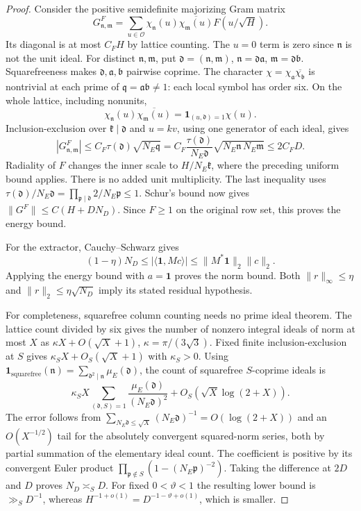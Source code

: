 \documentclass[11pt]{article}
\theoremstyle{remark}\newtheorem{remark}[theorem]{Remark}
\begin{document}
\begin{proof}
Consider the positive semidefinite majorizing Gram matrix
\[
 G^F_{\mathfrak n,\mathfrak m}
 =\sum_{u\in\mathcal O}\chi_{\mathfrak n}(u)
       \overline{\chi_{\mathfrak m}(u)}F(u/\sqrt H).
\]
Its diagonal is at most $C_FH$ by lattice counting.
The $u=0$ term is zero since $\mathfrak n$ is not the unit ideal.
For distinct $\mathfrak n,\mathfrak m$, put
$\mathfrak d=(\mathfrak n,\mathfrak m)$,
$\mathfrak n=\mathfrak d\mathfrak a$,
$\mathfrak m=\mathfrak d\mathfrak b$.
Squarefreeness makes $\mathfrak d,\mathfrak a,\mathfrak b$
pairwise coprime. The character
$\chi=\chi_{\mathfrak a}\overline{\chi_{\mathfrak b}}$
is nontrivial at each prime of
$\mathfrak q=\mathfrak a\mathfrak b\ne1$:
each local symbol has order six.
On the whole lattice, including nonunits,
\[
 \chi_{\mathfrak n}(u)\overline{\chi_{\mathfrak m}(u)}
       =\mathbf1_{(u,\mathfrak d)=1}\chi(u).
\]
Inclusion-exclusion over $\mathfrak k\mid\mathfrak d$ and
$u=kv$, using one generator of each ideal, gives
\[
 |G^F_{\mathfrak n,\mathfrak m}|
 \le C_F\tau(\mathfrak d)\sqrt{N_E\mathfrak q}
 =C_F\frac{\tau(\mathfrak d)}{N_E\mathfrak d}
             \sqrt{N_E\mathfrak n\,N_E\mathfrak m}
 \le2C_FD.
\]
Radiality of $F$ changes the inner scale to $H/N_E\mathfrak k$,
where the preceding uniform bound applies. There is no added
unit multiplicity. The last inequality uses
$\tau(\mathfrak d)/N_E\mathfrak d
=\prod_{\mathfrak p\mid\mathfrak d}2/N_E\mathfrak p\le1$.
Schur's bound now gives
$\|G^F\|\le C(H+DN_D)$.
Since $F\ge1$ on the original row set, this proves the energy bound.

For the extractor, Cauchy--Schwarz gives
\[
 (1-\eta)N_D\le|\langle\mathbf1,Mc\rangle|
 \le\|M^*\mathbf1\|_2\|c\|_2.
\]
Applying the energy bound with $a=\mathbf1$ proves the norm bound.
Both $\|r\|_\infty\le\eta$ and
$\|r\|_2\le\eta\sqrt{N_D}$ imply its stated residual hypothesis.

For completeness, squarefree column counting needs no prime ideal
theorem. The lattice count divided by six gives the number of
nonzero integral ideals of norm at most $X$ as
$\kappa X+O(\sqrt X+1)$, $\kappa=\pi/(3\sqrt3)$.
Fixed finite inclusion-exclusion at $S$ gives
$\kappa_SX+O_S(\sqrt X+1)$ with $\kappa_S>0$.
Using $\mathbf1_{\mathrm{squarefree}}(\mathfrak n)
=\sum_{\mathfrak d^2\mid\mathfrak n}\mu_E(\mathfrak d)$,
the count of squarefree $S$-coprime ideals is
\[
 \kappa_SX
  \sum_{(\mathfrak d,S)=1}\frac{\mu_E(\mathfrak d)}
                                  {(N_E\mathfrak d)^2}
       +O_S(\sqrt X\log(2+X)).
\]
The error follows from
$\sum_{N_E\mathfrak d\le\sqrt X}(N_E\mathfrak d)^{-1}
=O(\log(2+X))$ and an $O(X^{-1/2})$ tail for the absolutely
convergent squared-norm series, both by partial summation of
the elementary ideal count. The coefficient is positive by
its convergent Euler product
$\prod_{\mathfrak p\notin S}(1-(N_E\mathfrak p)^{-2})$.
Taking the difference at $2D$ and $D$ proves $N_D\asymp_SD$.
For fixed $0<\vartheta<1$ the resulting lower bound is
$\gg_SD^{-1}$, whereas
$H^{-1+o(1)}=D^{-1-\vartheta+o(1)}$, which is smaller.
\end{proof}
\end{document}
